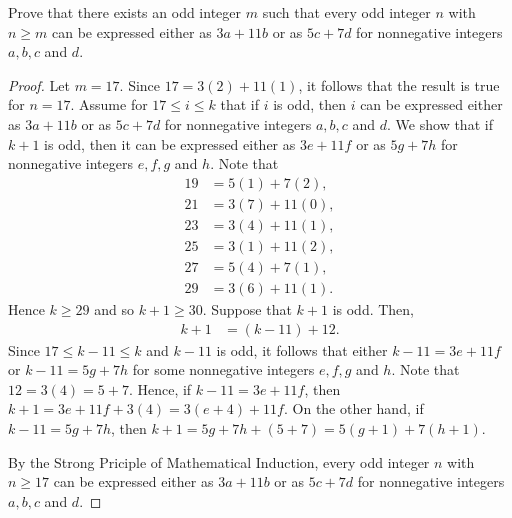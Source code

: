\documentclass[12pt]{article}
\newenvironment{problem}[2][Problem]{\begin{trivlist}
		\item[\hskip \labelsep {\bfseries #1}\hskip \labelsep {\bfseries #2.}]}{\end{trivlist}}
\begin{document}
	\begin{problem}{47}
		Prove that there exists an odd integer $m$ such that every odd integer $n$ with $n\geq m$ can be expressed either as $3a+11b$ or as $5c+7d$ for nonnegative integers $a,b,c$ and $d$.
		\begin{proof}
			Let $m = 17$. Since $17 = 3(2)+11(1)$, it follows that the result is true for $n=17$. Assume for $17\leq i \leq k$ that if $i$ is odd, then $i$ can be expressed either as $3a+11b$ or as $5c+7d$ for nonnegative integers $a,b,c$ and $d$. We show that if $k+1$ is odd, then it can be expressed either as $3e+11f$ or as $5g+7h$ for nonnegative integers $e,f,g$ and $h$. Note that
			\begin{align*}
				19 &= 5(1)+7(2),\\
				21 &= 3(7) + 11(0),\\
				23 &= 3(4) +11(1),\\
				25 &= 3(1) + 11(2),\\
				27 &= 5(4) + 7(1),\\
				29 &= 3(6) + 11(1).
			\end{align*}
		Hence $k\geq 29$ and so $k+1 \geq 30$. Suppose that $k+1$ is odd. Then,
		\begin{align*}
			k+1 &= (k-11) +12.
		\end{align*}
	Since $17 \leq k-11 \leq k$ and $k-11$ is odd, it follows that either $k-11 = 3e + 11f$ or $k-11 = 5g + 7h$ for some nonnegative integers $e,f,g$ and $h$. Note that $12 = 3(4) = 5+7$. Hence, if $k-11 = 3e+11f$, then $k+1 = 3e+11f +3(4) = 3(e+4)+11f$. On the other hand, if $k-11 = 5g+7h$, then $k+1 = 5g+7h + (5+7) = 5(g+1) + 7(h+1)$. 
	
	By the Strong Priciple of Mathematical Induction, every odd integer $n$ with $n\geq 17$ can be expressed either as $3a+11b$ or as $5c+7d$ for nonnegative integers $a,b,c$ and $d$.
		\end{proof}
	\end{problem}
\end{document}
